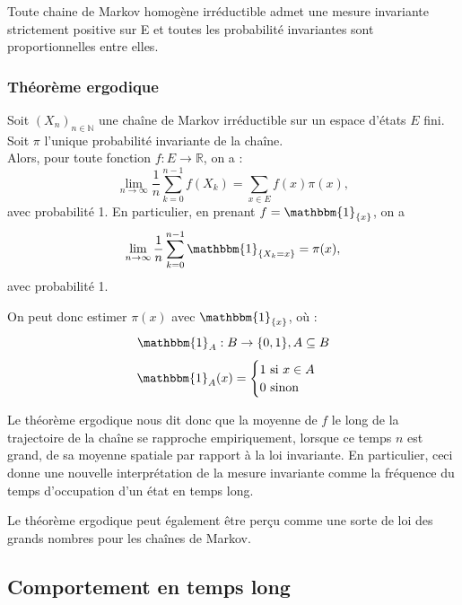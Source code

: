 \documentclass{article}
\begin{document}
\begin{tcolorbox}[colback=white,colframe=blue!80!black,title=Probabilité invariante d'une chaîne de Markov irréductible]
Toute chaine de Markov homogène irréductible admet une mesure invariante strictement positive sur E et toutes les probabilité invariantes sont proportionnelles entre elles.
\end{tcolorbox}

\newpage
\subsubsection{Théorème ergodique}

\begin{tcolorbox}[colback=white,colframe=red!80!black,title=Théorème ergodique (admis)]

Soit $(X_n)_{n \in \mathbb{N}}$ une chaîne de Markov irréductible sur un espace d'états $E$ fini. Soit $\pi$ l'unique probabilité invariante de la chaîne. \\

Alors, pour toute fonction $f : E \to \mathbb{R}$, on a :
\[
\lim_{n \to \infty} \frac{1}{n} \sum_{k=0}^{n-1} f(X_k) = \sum_{x \in E} f(x)\pi(x),
\]
avec probabilité 1. En particulier, en prenant $f = \mathbbm{1}_{\{x\}}$, on a
\[
\lim_{n \to \infty} \frac{1}{n} \sum_{k=0}^{n-1} \mathbbm{1}_{\{X_k = x\}} = \pi(x),
\]
avec probabilité 1.

\end{tcolorbox}

On peut donc estimer $\pi(x)$ avec $\mathbbm{1}_{\{x\}} $, où :
\[
    \mathbbm{1}_{A} : B \to \{0,1\}, A \subseteq B
\]
\[
    \mathbbm{1}_{A}(x) = \begin{cases}
        1 \text{ si } x \in A \\
        0 \text{ sinon} 
    \end{cases}
\]

Le théorème ergodique nous dit donc que la moyenne de $f$ le long de la trajectoire de la chaîne se rapproche empiriquement,
lorsque ce temps $n$ est grand, de sa moyenne spatiale par rapport à la loi invariante. En particulier, 
ceci donne une nouvelle interprétation de la mesure invariante comme la fréquence du temps d'occupation d'un état en temps long.

Le théorème ergodique peut également être perçu comme une sorte de loi des grands nombres pour les chaînes de Markov.

\newpage %
\subsection{Comportement en temps long}
\end{document}
